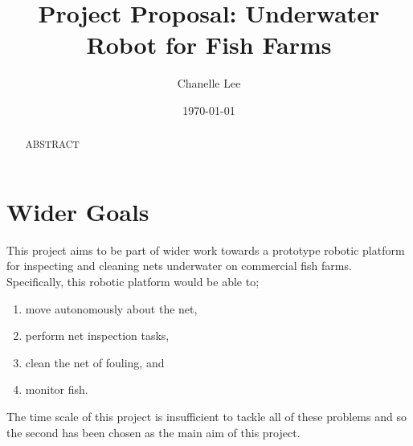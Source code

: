 \documentclass[11.5pt, twoside, a4paper]{article}
\begin{document}
\title{Project Proposal: Underwater Robot for Fish Farms}
\author{Chanelle Lee}
\date{\today}
\maketitle

\begin{abstract}
ABSTRACT
\end{abstract}

\section{Wider Goals}
This project aims to be part of wider work towards a prototype robotic platform for inspecting and cleaning nets underwater on commercial fish farms. Specifically, this robotic platform would be able to;
\begin{enumerate}
\item move autonomously about the net,
\item perform net inspection tasks,
\item clean the net of fouling, and
\item monitor fish.
\end{enumerate}
The time scale of this project is insufficient to tackle all of these problems and so the second has been chosen as the main aim of this project.
\end{document}
